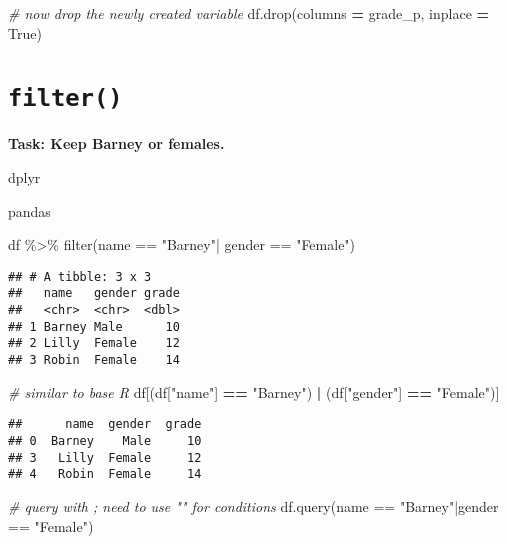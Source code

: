 \documentclass[
]{book}
\newenvironment{Shaded}{\begin{snugshade}}{\end{snugshade}}
\newcommand{\CommentTok}[1]{\textcolor[rgb]{0.56,0.35,0.01}{\textit{#1}}}
\newcommand{\FunctionTok}[1]{\textcolor[rgb]{0.00,0.00,0.00}{#1}}
\newcommand{\NormalTok}[1]{#1}
\newcommand{\OperatorTok}[1]{\textcolor[rgb]{0.81,0.36,0.00}{\textbf{#1}}}
\newcommand{\SpecialCharTok}[1]{\textcolor[rgb]{0.00,0.00,0.00}{#1}}
\newcommand{\StringTok}[1]{\textcolor[rgb]{0.31,0.60,0.02}{#1}}
\newcommand{\VariableTok}[1]{\textcolor[rgb]{0.00,0.00,0.00}{#1}}
\begin{document}
\begin{Shaded}
\begin{Highlighting}[]
\CommentTok{\# now drop the newly created variable}
\NormalTok{df.drop(columns }\OperatorTok{=} \StringTok{\textquotesingle{}grade\_p\textquotesingle{}}\NormalTok{, inplace }\OperatorTok{=} \VariableTok{True}\NormalTok{)}
\end{Highlighting}
\end{Shaded}

\hypertarget{filter}{%
\section{\texorpdfstring{\texttt{filter()}}{filter()}}\label{filter}}

{\textbf{Task: Keep Barney or females.
}}

dplyr

pandas

\begin{Shaded}
\begin{Highlighting}[]
\NormalTok{df }\SpecialCharTok{\%\textgreater{}\%} 
  \FunctionTok{filter}\NormalTok{(name }\SpecialCharTok{==} \StringTok{"Barney"}\SpecialCharTok{|}
\NormalTok{         gender }\SpecialCharTok{==} \StringTok{"Female"}\NormalTok{)}
\end{Highlighting}
\end{Shaded}

\begin{verbatim}
## # A tibble: 3 x 3
##   name   gender grade
##   <chr>  <chr>  <dbl>
## 1 Barney Male      10
## 2 Lilly  Female    12
## 3 Robin  Female    14
\end{verbatim}

\begin{Shaded}
\begin{Highlighting}[]
\CommentTok{\# similar to base R}
\NormalTok{df[(df[}\StringTok{"name"}\NormalTok{] }\OperatorTok{==} \StringTok{"Barney"}\NormalTok{) }\OperatorTok{|} 
\NormalTok{   (df[}\StringTok{"gender"}\NormalTok{] }\OperatorTok{==} \StringTok{"Female"}\NormalTok{)]}
\end{Highlighting}
\end{Shaded}

\begin{verbatim}
##      name  gender  grade
## 0  Barney    Male     10
## 3   Lilly  Female     12
## 4   Robin  Female     14
\end{verbatim}

\begin{Shaded}
\begin{Highlighting}[]
\CommentTok{\# query with \textquotesingle{}\textquotesingle{}; need to use "" for conditions}
\NormalTok{df.query(}\StringTok{\textquotesingle{}name == "Barney"|gender == "Female"\textquotesingle{}}\NormalTok{)}
\end{Highlighting}
\end{Shaded}
\end{document}
